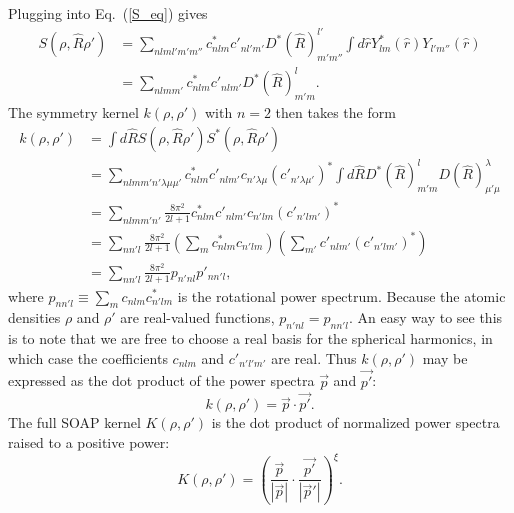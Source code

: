 \documentclass[%
preprint,
amsmath,amssymb,
aps,
]{revtex4-1}
\begin{document}
Plugging into Eq.\ (\ref{S_eq}) gives
\begin{equation}
    \begin{split}
S(\rho, \hat{R} \rho') &= \sum_{n l m l' m' m''} c^*_{n l m} c'_{n l' m'} D^*(\hat{R})^{l'}_{m' m''} \int d\hat{r} Y^*_{l m }(\hat{r}) Y_{l' m''}(\hat{r}) \\
&= \sum_{n l m m'} c^*_{n l m} c'_{n l m'} D^*(\hat{R})^l_{m' m}.
    \end{split}
\end{equation}
The symmetry kernel $k(\rho, \rho')$ with $n = 2$ then takes the form
\begin{equation}
    \begin{split}
k(\rho, \rho') &= \int d\hat{R} S(\rho, \hat{R}\rho') S^*(\rho, \hat{R} \rho') \\
&= \sum_{n l m m' n' \lambda \mu \mu'} c^*_{n l m} c'_{n l m'} c_{n' \lambda \mu} (c'_{n' \lambda \mu'})^* \int d\hat{R} D^*(\hat{R})^l_{m' m} D(\hat{R})^\lambda_{\mu' \mu} \\
&= \sum_{n l m m' n'} \frac{8 \pi^2}{2l+1} c^*_{n l m} c'_{n l m'} c_{n' l m} (c'_{n' l m'})^* \\
&= \sum_{n n' l} \frac{8\pi^2}{2l+1} \left(\sum_{m} c^*_{n l m} c_{n' l m} \right) \left(\sum_{m'} c'_{n l m'} (c'_{n' l m'})^* \right) \\
&= \sum_{n n' l} \frac{8\pi^2}{2l+1} p_{n' n l} p'_{n n' l},
    \end{split}
\end{equation}
where $p_{n n' l} \equiv \sum_{m} c_{n l m} c_{n' l m}^*$ is the rotational power spectrum. Because the atomic densities $\rho$ and $\rho'$ are real-valued functions, $p_{n' n l} = p_{n n' l}$. An easy way to see this is to note that we are free to choose a real basis for the spherical harmonics, in which case the coefficients $c_{n l m}$ and $c'_{n' l' m'}$ are real. Thus $k(\rho, \rho')$ may be expressed as the dot product of the power spectra $\vec{p}$ and $\vec{p'}$:
\begin{equation}
k(\rho, \rho') = \vec{p} \cdot \vec{p'}.
\end{equation}
The full SOAP kernel $K(\rho, \rho')$ is the dot product of normalized power spectra raised to a positive power:
\begin{equation}
K(\rho, \rho') = \left( \frac{\vec{p}}{|\vec{p}|} \cdot \frac{\vec{p'}}{|\vec{p}'|} \right)^{\xi}.
\end{equation}

\end{document}
